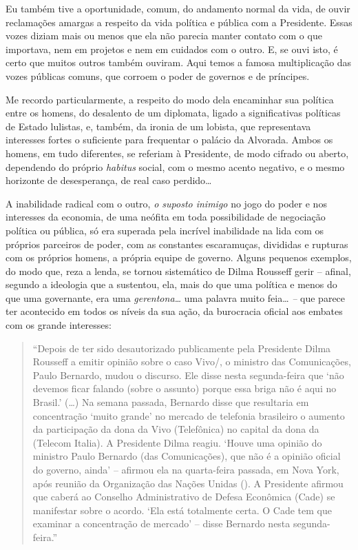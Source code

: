 Eu também tive a oportunidade, comum, do andamento normal da vida, de
ouvir reclamações amargas a respeito da vida política e pública com a
Presidente. Essas vozes diziam mais ou menos que ela não parecia manter
contato com o que importava, nem em projetos e nem em cuidados com o
outro. E, se ouvi isto, é certo que muitos outros também ouviram. Aqui
temos a famosa multiplicação das vozes públicas comuns, que corroem o
poder de governos e de príncipes.

Me recordo particularmente, a respeito do modo dela encaminhar sua
política entre os homens, do desalento de um diplomata, ligado a
significativas políticas de Estado lulistas, e, também, da ironia de um
lobista, que representava interesses fortes o suficiente para frequentar
o palácio da Alvorada. Ambos os homens, em tudo diferentes, se referiam
à Presidente, de modo cifrado ou aberto, dependendo do próprio
\emph{habitus} social, com o mesmo acento negativo, e o mesmo horizonte
de desesperança, de real caso perdido…

A inabilidade radical com o outro, \emph{o suposto inimigo} no jogo do
poder e nos interesses da economia, de uma neófita em toda possibilidade
de negociação política ou pública, só era superada pela incrível
inabilidade na lida com os próprios parceiros de poder, com as
constantes escaramuças, divididas e rupturas com os próprios homens, a
própria equipe de governo. Alguns pequenos exemplos, do modo que, reza a
lenda, se tornou sistemático de Dilma Rousseff gerir -- afinal, segundo
a ideologia que a sustentou, ela, mais do que uma política e menos do
que uma governante, era uma \emph{gerentona…} uma palavra muito
feia… \emph{--} que parece ter acontecido em todos os níveis da sua
ação, da burocracia oficial aos embates com os grande interesses:



\begin{quote}
``Depois de ter
sido {desautorizado
publicamente pela Presidente Dilma Rousseff a emitir opinião sobre o
caso Vivo/}, o ministro das Comunicações, Paulo Bernardo, mudou o
discurso. Ele disse nesta segunda-feira que `não devemos ficar falando
(sobre o assunto) porque essa briga não é aqui no Brasil.' (…) Na
semana passada, Bernardo disse que resultaria em concentração `muito
grande' no mercado de telefonia brasileiro o aumento da participação da
dona da Vivo (Telefônica) no capital da dona da  (Telecom Italia). A
Presidente Dilma reagiu. `Houve uma opinião do ministro Paulo Bernardo
(das Comunicações), que não é a opinião oficial do governo, ainda' --
afirmou ela na quarta-feira passada, em Nova York, após reunião da
Organização das Nações Unidas (). A Presidente afirmou que caberá ao
Conselho Administrativo de Defesa Econômica (Cade) se manifestar sobre o
acordo. `Ela está totalmente certa. O Cade tem que examinar a
concentração de mercado' -- disse Bernardo nesta segunda-feira.''
\end{quote}

